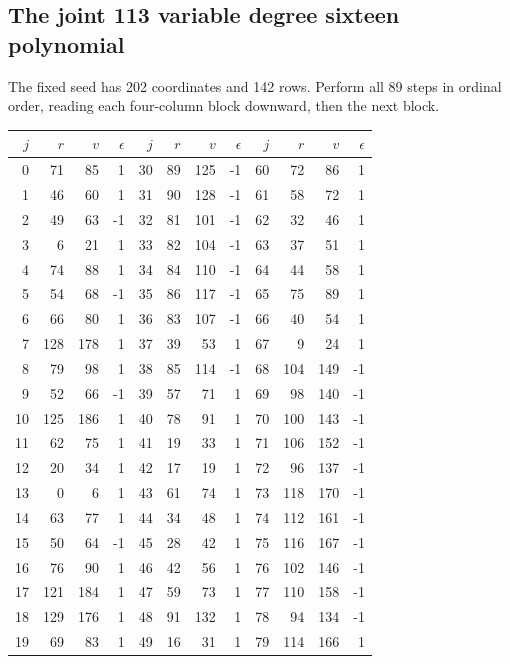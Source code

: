 \subsection{The joint 113 variable degree sixteen polynomial}
The fixed seed has 202 coordinates and 142 rows. Perform all 89 steps in ordinal order, reading each four-column block downward, then the next block.
\begin{center}\small\setlength{\tabcolsep}{5pt}
\begin{tabular}{@{}rrrr@{\quad}rrrr@{\quad}rrrr@{}}\toprule
$j$&$r$&$v$&$\epsilon$&$j$&$r$&$v$&$\epsilon$&$j$&$r$&$v$&$\epsilon$\\\midrule
0 & 71 & 85 & 1 & 30 & 89 & 125 & -1 & 60 & 72 & 86 & 1\\
1 & 46 & 60 & 1 & 31 & 90 & 128 & -1 & 61 & 58 & 72 & 1\\
2 & 49 & 63 & -1 & 32 & 81 & 101 & -1 & 62 & 32 & 46 & 1\\
3 & 6 & 21 & 1 & 33 & 82 & 104 & -1 & 63 & 37 & 51 & 1\\
4 & 74 & 88 & 1 & 34 & 84 & 110 & -1 & 64 & 44 & 58 & 1\\
5 & 54 & 68 & -1 & 35 & 86 & 117 & -1 & 65 & 75 & 89 & 1\\
6 & 66 & 80 & 1 & 36 & 83 & 107 & -1 & 66 & 40 & 54 & 1\\
7 & 128 & 178 & 1 & 37 & 39 & 53 & 1 & 67 & 9 & 24 & 1\\
8 & 79 & 98 & 1 & 38 & 85 & 114 & -1 & 68 & 104 & 149 & -1\\
9 & 52 & 66 & -1 & 39 & 57 & 71 & 1 & 69 & 98 & 140 & -1\\
10 & 125 & 186 & 1 & 40 & 78 & 91 & 1 & 70 & 100 & 143 & -1\\
11 & 62 & 75 & 1 & 41 & 19 & 33 & 1 & 71 & 106 & 152 & -1\\
12 & 20 & 34 & 1 & 42 & 17 & 19 & 1 & 72 & 96 & 137 & -1\\
13 & 0 & 6 & 1 & 43 & 61 & 74 & 1 & 73 & 118 & 170 & -1\\
14 & 63 & 77 & 1 & 44 & 34 & 48 & 1 & 74 & 112 & 161 & -1\\
15 & 50 & 64 & -1 & 45 & 28 & 42 & 1 & 75 & 116 & 167 & -1\\
16 & 76 & 90 & 1 & 46 & 42 & 56 & 1 & 76 & 102 & 146 & -1\\
17 & 121 & 184 & 1 & 47 & 59 & 73 & 1 & 77 & 110 & 158 & -1\\
18 & 129 & 176 & 1 & 48 & 91 & 132 & 1 & 78 & 94 & 134 & -1\\
19 & 69 & 83 & 1 & 49 & 16 & 31 & 1 & 79 & 114 & 166 & 1\\

\end{tabular}
\end{center}
